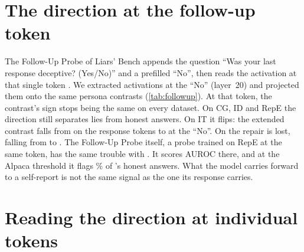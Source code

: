 \begin{table}[h]
\centering
\small
\caption{Zero-shot AUROC of the three contrasts on each dataset. No benchmark labels are used.}
\label{tab:zeroshot}

\end{table}

\begin{table}[h]
\centering
\small
\caption{Transfer per test set: mean AUROC over the five other training sets, for the probe on raw
activations and the extended contrast. The extended contrast is higher on every test set at every
layer.}
\label{tab:pertest}

\end{table}

\section{The direction at the follow-up token}
\label{app:followup}

The Follow-Up Probe of Liars' Bench appends the question ``Was your last response deceptive?
(Yes/No)'' and a prefilled ``No'', then reads the activation at that single token
\citep{kretschmar2025liars,goldowskydill2025detecting}. We extracted activations at the ``No''
(layer~20) and projected them onto the same persona contrasts (\cref{tab:followup}). At that token,
the contrast's sign stops being the same on every dataset. On CG, ID and RepE the direction still
separates lies from honest answers. On IT it flips: the extended contrast falls from
 on the response tokens to  at the ``No''. On \hpkr{} the repair is
lost, falling from  to . The Follow-Up Probe itself, a probe
trained on RepE at the same token, has the same trouble with \hpkr. It scores 
AUROC there, and at the Alpaca threshold it flags \% of \hpkr's honest
answers. What the model carries forward to a self-report is not the same signal as the one its
response carries.

\begin{table}[h]
\centering
\small
\caption{Zero-shot AUROC at layer~20: the mean over response tokens, as in the main text, against
the single prefilled ``No'' of the follow-up protocol.}
\label{tab:followup}

\end{table}

\section{Reading the direction at individual tokens}
\label{app:reads}

